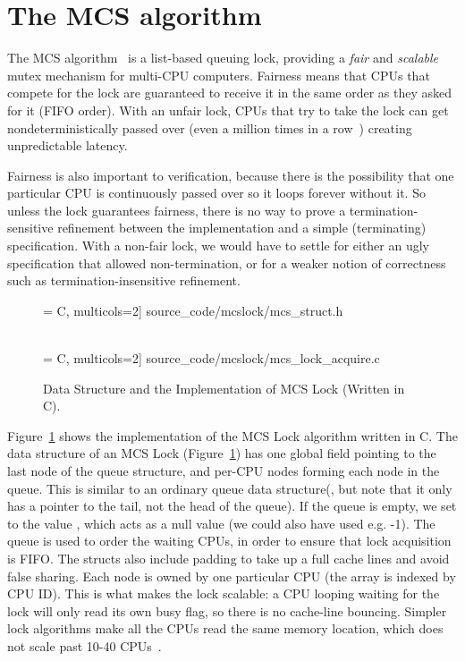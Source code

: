 \section{The MCS algorithm}
\label{chapter:mcslock:sec:overview}

The MCS algorithm~\cite{mcs91} is a list-based queuing lock,
providing a \emph{fair} and \emph{scalable} mutex mechanism for
multi-CPU computers. Fairness means that
CPUs that compete for the lock are guaranteed to receive it in the same
order as they asked for it (FIFO order). With an unfair lock, CPUs
that try to take the lock can get nondeterministically passed over
(even a million times in a row~\cite{lwn:ticketlocks}) creating
unpredictable latency.

Fairness is also important to verification, because
there is the possibility that one particular CPU is continuously
passed over so it loops forever without it.
So unless the lock
guarantees fairness, there is no way to prove a termination-sensitive
refinement between the implementation and a simple (terminating)
specification. With a non-fair lock, we would have to settle for
either an ugly specification that allowed non-termination, or for a
weaker notion of correctness such as termination-insensitive
refinement.

\begin{figure}
\begin{minipage}{\linewidth}
 = C, multicols=2] {source_code/mcslock/mcs_struct.h}
\end{minipage}
\\

 = C, multicols=2] {source_code/mcslock/mcs_lock_acquire.c}
\caption{Data Structure and the Implementation of MCS Lock (Written in C).}
\label{fig:chapter:mcslock:mcs_lock}
\end{figure}

Figure~\ref{fig:chapter:mcslock:mcs_lock} shows the implementation of the MCS Lock algorithm written in C. 
The data structure of an MCS Lock (Figure~\ref{fig:chapter:mcslock:mcs_lock}) has
one global field pointing to the last node of the queue structure, and
per-CPU nodes forming each node in the queue. This is similar to an
ordinary queue data structure(, but note that it only has a
pointer to the tail, not the head of the queue).  If the queue is
empty, we set  to the value , which
acts as a null value (we could also have used e.g. -1). The queue is
used to order the waiting CPUs, in order to ensure that lock
acquisition is FIFO. The structs also include padding to take up a
full cache lines and avoid false sharing.  Each node is owned by one
particular CPU (the array is indexed by CPU ID).  This is what makes
the lock scalable: a CPU looping waiting for the lock will only read
its own busy flag, so there is no cache-line bouncing. Simpler lock
algorithms make all the CPUs read the same memory location, which does
not scale past 10-40 CPUs~\cite{Boyd-wickizer12}.

